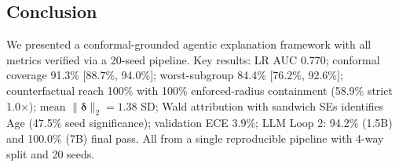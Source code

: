 \documentclass[11pt,a4paper]{article}
\theoremstyle{plain}
\begin{document}
\subsection{Conclusion}

We presented a conformal-grounded agentic explanation framework with all metrics verified via a 20-seed pipeline. Key results: LR AUC 0.770; conformal coverage 91.3\% [88.7\%, 94.0\%]; worst-subgroup 84.4\% [76.2\%, 92.6\%]; counterfactual reach 100\% with 100\% enforced-radius containment (58.9\% strict 1.0$\times$); mean $\|\boldsymbol{\delta}\|_2=1.38$ SD; Wald attribution with sandwich SEs identifies Age (47.5\% seed significance); validation ECE 3.9\%; LLM Loop 2: 94.2\% (1.5B) and 100.0\% (7B) final pass. All from a single reproducible pipeline with 4-way split and 20 seeds.



\end{document}

